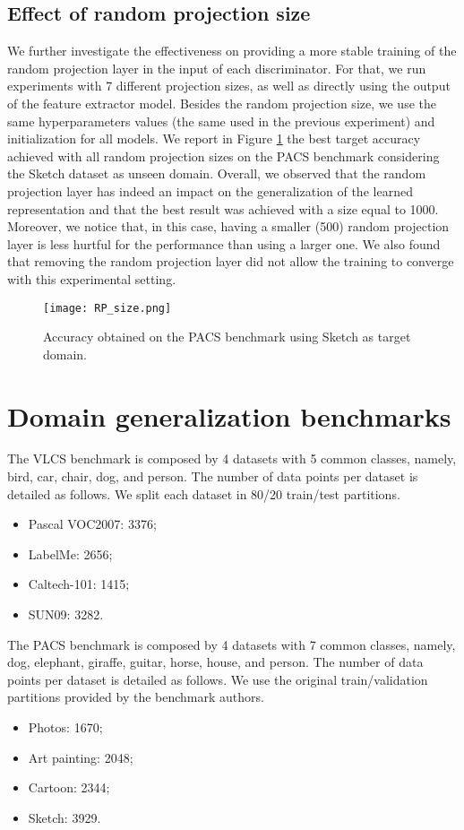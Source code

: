 \documentclass{article}
\begin{document}
\subsection{Effect of random projection size}
We further investigate the effectiveness on providing a more stable training of the random projection layer in the input of each discriminator. For that, we run experiments with 7 different projection sizes, as well as directly using the output of the feature extractor model. Besides the random projection size, we use the same hyperparameters values (the same used in the previous experiment) and initialization for all models. We report in Figure \ref{fig:res_rpsize} the best target accuracy achieved with all random projection sizes on the PACS benchmark considering the Sketch dataset as unseen domain. Overall, we observed that the random projection layer has indeed an impact on the generalization of the learned representation and that the best result was achieved with a size equal to 1000. Moreover, we notice that, in this case, having a smaller (500) random projection layer is less hurtful for the performance than using a larger one. We also found that removing the random projection layer did not allow the training to converge with this experimental setting.
\begin{figure}[h!]
    \centering
    \texttt{[image: RP\_size.png]}
    \caption{Accuracy obtained on the PACS benchmark using Sketch as target domain.}
    \label{fig:res_rpsize}
\end{figure}

\section{Domain generalization benchmarks}
The VLCS benchmark is composed by 4 datasets with 5 common classes, namely, bird, car, chair, dog, and person. The number of data points per dataset is detailed as follows. We split each dataset in 80/20 train/test partitions. 
\begin{itemize}
    \item Pascal VOC2007: 3376;
    \item LabelMe: 2656;
    \item Caltech-101: 1415;
    \item SUN09: 3282.
\end{itemize}
The PACS benchmark is composed by 4 datasets with 7 common classes, namely, dog, elephant, giraffe, guitar, horse, house, and person. The number of data points per dataset is detailed as follows. We use the original train/validation partitions provided by the benchmark authors.
\begin{itemize}
    \item Photos: 1670;
    \item Art painting: 2048;
    \item Cartoon: 2344;
    \item Sketch: 3929.
\end{itemize}
\end{document}

